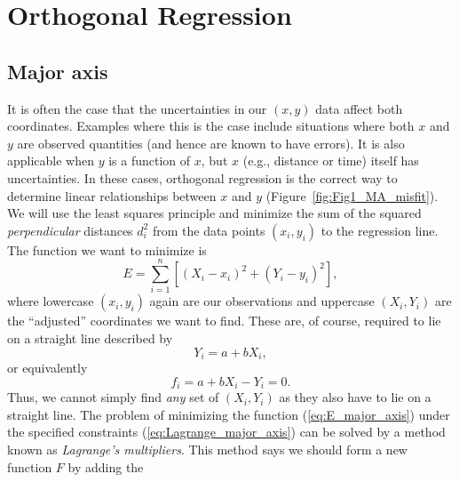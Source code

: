 \section{Orthogonal Regression}
\subsection{Major axis}

	It is often the case that the uncertainties in our $(x,y)$ data affect both coordinates.  
Examples where this is the case include situations where both $x$ and $y$ are observed quantities 
(and hence are known to have errors).  It is also  applicable when $y$ is a function of $x$, but $x$ (e.g., distance 
or time) itself has uncertainties.  In these cases, orthogonal regression is the correct way to 
determine linear relationships between $x$ and $y$ (Figure~\ref{fig:Fig1_MA_misfit}).
We will use the least squares principle and minimize the sum of the squared \emph{perpendicular} 
distances $d_i^2$ from the data points $(x_i,y_i)$ to the regression line.  The function we want to minimize is
\begin{equation}
E = \sum_{i=1}^n \left [ (X_i - x_i)^2 + (Y_i - y_i)^2 \right ],
\label{eq:E_major_axis}
\end{equation}	 	
where lowercase $(x_i, y_i)$ again are our observations and uppercase $(X_i, Y_i)$ are the ``adjusted'' 
coordinates we want to find.  These are, of course, required to  lie on a straight line described by
\begin{equation}
Y_i = a + bX_i,
\label{eq:line_constraint}
\end{equation}	
or equivalently
\begin{equation}
f_i = a + bX_i - Y_i = 0.
\label{eq:Lagrange_major_axis}
\end{equation}
Thus, we cannot simply find \emph{any} set of $(X_i, Y_i)$ as they also have to lie on a straight line.  The problem 
of minimizing the function (\ref{eq:E_major_axis}) under the specified constraints (\ref{eq:Lagrange_major_axis}) can be solved by a method 
known as \emph{Lagrange's multipliers}.  This method says we should form a new function $F$ by adding the 
